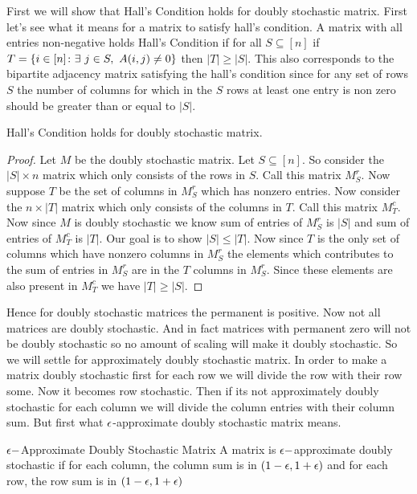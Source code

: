First we will show that Hall's Condition holds for doubly stochastic matrix. First let's see what it means for a matrix to satisfy hall's condition. A matrix with all entries non-negative holds Hall's Condition if for all $S\subseteq [n]$ if $T=\{i\in [n]\colon \exs\ j\in S,\ A(i,j)\neq 0\}$ then $|T|\geq |S|$. This also corresponds to the bipartite adjacency matrix satisfying the hall's condition since for any set of rows $S$ the number of columns for which in the $S$ rows at least one entry is non zero should be greater than or equal to $|S|$.
\begin{lemma}{}{}
	Hall's Condition holds for doubly stochastic matrix.
\end{lemma}
\begin{proof}
	Let $M$ be the doubly stochastic matrix. Let $S\subseteq [n]$. So consider the $|S|\times n$ matrix which only consists of the rows in $S$. Call this matrix $M_S^r$. Now suppose $T$ be the set of columns in $M_S^r$ which has nonzero entries. Now consider the $n\times |T|$ matrix which only consists of the columns in $T$. Call this matrix $M_T^c$. Now since $M$ is doubly stochastic we know sum of entries of $M_S^r$ is $|S|$ and sum of entries of $M_T^c$ is $|T|$. Our goal is to show $|S|\leq |T|$. Now since $T$ is the only set of columns which have nonzero columns in $M_S^r$ the elements which contributes to the sum of entries in $M_S^r$ are in the  $T$ columns in $M_S^r$. Since these elements are also present in $M_T^c$ we have $|T|\geq |S|$. 
\end{proof}

Hence for doubly stochastic matrices the permanent is positive. Now not all matrices are doubly stochastic. And in fact matrices with permanent zero will not be doubly stochastic so no amount of scaling will make it doubly stochastic. So we will settle for approximately doubly stochastic matrix. In order to make a matrix doubly stochastic first for each row we will divide the row with their row some. Now it becomes row stochastic. Then if its not approximately doubly stochastic for each column we will divide the column entries with their column sum. But first what $\epsilon$-approximate doubly stochastic matrix means.

\begin{Definition}{$\epsilon-$Approximate Doubly Stochastic Matrix}{}
	A  matrix is $\epsilon-$approximate doubly stochastic if for each column, the column sum is in $(1-\epsilon,1+\epsilon)$ and  for each row, the row sum is in $(1-\epsilon,1+\epsilon)$
\end{Definition}

